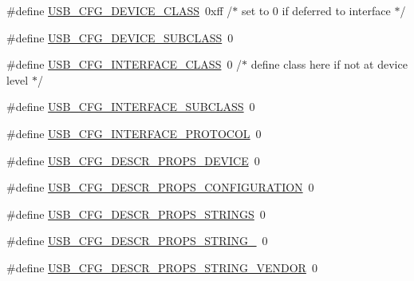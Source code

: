 \begin{DoxyCompactItemize}
\item 
\#define \hyperlink{mhvlib-_vusb-_console_2vusb_2usbconfig-prototype_8h_a9ce4f96ad98b3db8205691e8bc723e55}{U\-S\-B\-\_\-\-C\-F\-G\-\_\-\-D\-E\-V\-I\-C\-E\-\_\-\-C\-L\-A\-S\-S}~0xff    /$\ast$ set to 0 if deferred to interface $\ast$/
\item 
\#define \hyperlink{mhvlib-_vusb-_console_2vusb_2usbconfig-prototype_8h_a89e5ad66f8b835866e7d836c73bfd30d}{U\-S\-B\-\_\-\-C\-F\-G\-\_\-\-D\-E\-V\-I\-C\-E\-\_\-\-S\-U\-B\-C\-L\-A\-S\-S}~0
\item 
\#define \hyperlink{mhvlib-_vusb-_console_2vusb_2usbconfig-prototype_8h_a34f6fe9486b66e8220a82a0eb87a7447}{U\-S\-B\-\_\-\-C\-F\-G\-\_\-\-I\-N\-T\-E\-R\-F\-A\-C\-E\-\_\-\-C\-L\-A\-S\-S}~0   /$\ast$ define class here if not at device level $\ast$/
\item 
\#define \hyperlink{mhvlib-_vusb-_console_2vusb_2usbconfig-prototype_8h_ac643f27afa43062c19b8f0674b6be1b5}{U\-S\-B\-\_\-\-C\-F\-G\-\_\-\-I\-N\-T\-E\-R\-F\-A\-C\-E\-\_\-\-S\-U\-B\-C\-L\-A\-S\-S}~0
\item 
\#define \hyperlink{mhvlib-_vusb-_console_2vusb_2usbconfig-prototype_8h_a8ddab89b764bfd88d024c7d9c9931de3}{U\-S\-B\-\_\-\-C\-F\-G\-\_\-\-I\-N\-T\-E\-R\-F\-A\-C\-E\-\_\-\-P\-R\-O\-T\-O\-C\-O\-L}~0
\item 
\#define \hyperlink{mhvlib-_vusb-_console_2vusb_2usbconfig-prototype_8h_aa916bf33f6f8f481a219d0a81b5b225e}{U\-S\-B\-\_\-\-C\-F\-G\-\_\-\-D\-E\-S\-C\-R\-\_\-\-P\-R\-O\-P\-S\-\_\-\-D\-E\-V\-I\-C\-E}~0
\item 
\#define \hyperlink{mhvlib-_vusb-_console_2vusb_2usbconfig-prototype_8h_a8aae9f682ca9f91faae0453e4351a50b}{U\-S\-B\-\_\-\-C\-F\-G\-\_\-\-D\-E\-S\-C\-R\-\_\-\-P\-R\-O\-P\-S\-\_\-\-C\-O\-N\-F\-I\-G\-U\-R\-A\-T\-I\-O\-N}~0
\item 
\#define \hyperlink{mhvlib-_vusb-_console_2vusb_2usbconfig-prototype_8h_a750fb6cc3e8eafaddae659af97f6f737}{U\-S\-B\-\_\-\-C\-F\-G\-\_\-\-D\-E\-S\-C\-R\-\_\-\-P\-R\-O\-P\-S\-\_\-\-S\-T\-R\-I\-N\-G\-S}~0
\item 
\#define \hyperlink{mhvlib-_vusb-_console_2vusb_2usbconfig-prototype_8h_a9c0556a4c6c5a1ab8f6598aee8e5bf6a}{U\-S\-B\-\_\-\-C\-F\-G\-\_\-\-D\-E\-S\-C\-R\-\_\-\-P\-R\-O\-P\-S\-\_\-\-S\-T\-R\-I\-N\-G\-\_}~0
\item 
\#define \hyperlink{mhvlib-_vusb-_console_2vusb_2usbconfig-prototype_8h_a55edf2117128387162339d98ba2af0f4}{U\-S\-B\-\_\-\-C\-F\-G\-\_\-\-D\-E\-S\-C\-R\-\_\-\-P\-R\-O\-P\-S\-\_\-\-S\-T\-R\-I\-N\-G\-\_\-\-V\-E\-N\-D\-O\-R}~0
\item 

\end{DoxyCompactItemize}
